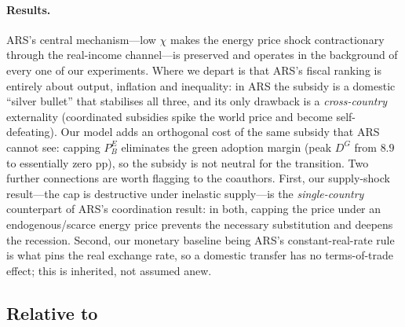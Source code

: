 \documentclass[11pt,a4paper]{article}
\begin{document}
\paragraph{Results.} ARS's central mechanism---low $\chi$ makes the energy
price shock contractionary through the real-income channel---is preserved and
operates in the background of every one of our experiments. Where we depart is
that ARS's fiscal ranking is entirely about output, inflation and inequality:
in ARS the subsidy is a domestic ``silver bullet'' that stabilises all three,
and its only drawback is a \emph{cross-country} externality (coordinated
subsidies spike the world price and become self-defeating). Our model adds an
orthogonal cost of the same subsidy that ARS cannot see: capping $P^E_B$
eliminates the green adoption margin (peak $D^G$ from $8.9$ to essentially zero pp), so the
subsidy is not neutral for the transition. Two further connections are worth
flagging to the coauthors. First, our supply-shock result---the cap is
destructive under inelastic supply---is the \emph{single-country} counterpart
of ARS's coordination result: in both, capping the price under an
endogenous/scarce energy price prevents the necessary substitution and deepens
the recession. Second, our monetary baseline being ARS's constant-real-rate
rule is what pins the real exchange rate, so a domestic transfer has no
terms-of-trade effect; this is inherited, not assumed anew.

\subsection{Relative to \citet{Bayer2026}}
\end{document}
